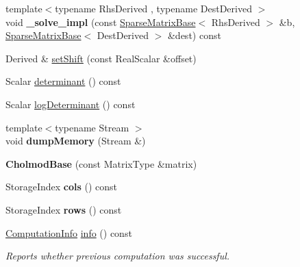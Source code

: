 \begin{DoxyCompactItemize}
\item 
\mbox{\label{class_eigen_1_1_cholmod_base_ad83e9fa24e94410bceadf0eb69793622}} 
{\footnotesize template$<$typename Rhs\+Derived , typename Dest\+Derived $>$ }\\void {\bfseries \+\_\+solve\+\_\+impl} (const \hyperlink{group___sparse_core___module_class_eigen_1_1_sparse_matrix_base}{Sparse\+Matrix\+Base}$<$ Rhs\+Derived $>$ \&b, \hyperlink{group___sparse_core___module_class_eigen_1_1_sparse_matrix_base}{Sparse\+Matrix\+Base}$<$ Dest\+Derived $>$ \&dest) const
\item 
Derived \& \hyperlink{class_eigen_1_1_cholmod_base_a886fc102723ca7bde4ac7162dfd72f5d}{set\+Shift} (const Real\+Scalar \&offset)
\item 
Scalar \hyperlink{class_eigen_1_1_cholmod_base_ab4ffb4a9735ad7e81a01d5789ce96547}{determinant} () const
\item 
Scalar \hyperlink{class_eigen_1_1_cholmod_base_a597f7839a39604af18a8741a0d8c46bf}{log\+Determinant} () const
\item 
\mbox{\label{class_eigen_1_1_cholmod_base_a1edeab014fff595aef0d8085f459253b}} 
{\footnotesize template$<$typename Stream $>$ }\\void {\bfseries dump\+Memory} (Stream \&)
\item 
\mbox{\label{class_eigen_1_1_cholmod_base_a1b54c3f3d0315a6c581c6ded51076bf6}} 
{\bfseries Cholmod\+Base} (const Matrix\+Type \&matrix)
\item 
\mbox{\label{class_eigen_1_1_cholmod_base_aa0b16898522cca48af94e96f8a27666d}} 
Storage\+Index {\bfseries cols} () const
\item 
\mbox{\label{class_eigen_1_1_cholmod_base_a849383115475b8bb4da3cfcc86a64e9e}} 
Storage\+Index {\bfseries rows} () const
\item 
\hyperlink{group__enums_ga85fad7b87587764e5cf6b513a9e0ee5e}{Computation\+Info} \hyperlink{class_eigen_1_1_cholmod_base_ada4cc43c64767d186fcb8997440cc753}{info} () const
\begin{DoxyCompactList}\small\item\em Reports whether previous computation was successful. \end{DoxyCompactList}\item 

\end{DoxyCompactItemize}
